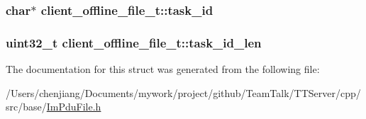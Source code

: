\subsubsection[{task\+\_\+id}]{\setlength{\rightskip}{0pt plus 5cm}char$\ast$ client\+\_\+offline\+\_\+file\+\_\+t\+::task\+\_\+id}\label{structclient__offline__file__t_a2fbfffa7e5ce92b4ee0c5c494c2b581e}
\hypertarget{structclient__offline__file__t_a564d47949b2f7d73cb292d3d1166058c}{}
\subsubsection[{task\+\_\+id\+\_\+len}]{\setlength{\rightskip}{0pt plus 5cm}uint32\+\_\+t client\+\_\+offline\+\_\+file\+\_\+t\+::task\+\_\+id\+\_\+len}\label{structclient__offline__file__t_a564d47949b2f7d73cb292d3d1166058c}


The documentation for this struct was generated from the following file\+:\begin{DoxyCompactItemize}
\item 
/\+Users/chenjiang/\+Documents/mywork/project/github/\+Team\+Talk/\+T\+T\+Server/cpp/src/base/\hyperlink{_im_pdu_file_8h}{Im\+Pdu\+File.\+h}\end{DoxyCompactItemize}
